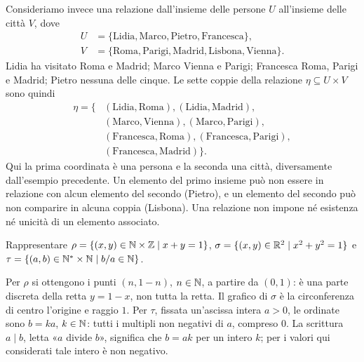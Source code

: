 \begin{esempio}
Consideriamo invece una relazione dall'insieme delle persone $U$ all'insieme delle città $V$, dove
\[
\begin{aligned}
U&=\{\text{Lidia},\text{Marco},\text{Pietro},\text{Francesca}\},\\
V&=\{\text{Roma},\text{Parigi},\text{Madrid},\text{Lisbona},\text{Vienna}\}.
\end{aligned}
\] Lidia ha visitato Roma e Madrid; Marco Vienna e Parigi; Francesca Roma, Parigi e Madrid; Pietro nessuna delle cinque. Le sette coppie della relazione $\eta\subseteq U\times V$ sono quindi
\[
\begin{split}
\eta=\{&(\text{Lidia},\text{Roma}),(\text{Lidia},\text{Madrid}),\\
&(\text{Marco},\text{Vienna}),(\text{Marco},\text{Parigi}),\\
&(\text{Francesca},\text{Roma}),(\text{Francesca},\text{Parigi}),\\
&(\text{Francesca},\text{Madrid})\}.
\end{split}
\]
Qui la prima coordinata è una persona e la seconda una città, diversamente dall'esempio precedente. Un elemento del primo insieme può non essere in relazione con alcun elemento del secondo (Pietro), e un elemento del secondo può non comparire in alcuna coppia (Lisbona). Una relazione non impone né esistenza né unicità di un elemento associato.
\end{esempio}

\begin{esercizio}
Rappresentare $\rho=\{(x,y)\in\mathbb{N}\times\mathbb{Z}\mid x+y=1\}$, $\sigma=\{(x,y)\in\mathbb{R}^2\mid x^2+y^2=1\}$ e $\tau=\{(a,b)\in\mathbb{N}^*\times\mathbb{N}\mid b/a\in\mathbb{N}\}$.
\end{esercizio}
\begin{svolgimento}
Per $\rho$ si ottengono i punti $(n,1-n)$, $n\in\mathbb{N}$, a partire da $(0,1)$: è una parte discreta della retta $y=1-x$, non tutta la retta. Il grafico di $\sigma$ è la circonferenza di centro l'origine e raggio $1$. Per $\tau$, fissata un'ascissa intera $a>0$, le ordinate sono $b=ka$, $k\in\mathbb{N}$: tutti i multipli non negativi di $a$, compreso $0$. La scrittura $a\mid b$, letta «$a$ divide $b$», significa che $b=ak$ per un intero $k$; per i valori qui considerati tale intero è non negativo.
\end{svolgimento}

